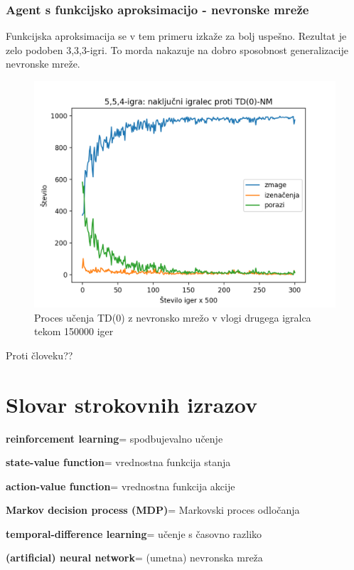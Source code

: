 \documentclass[12pt,a4paper]{amsart}
\theoremstyle{definition} %
\theoremstyle{plain} %
\newcommand{\geslo}[2]{\noindent\textbf{#1}\hspace*{3mm}\hangindent=\parindent\hangafter=1 #2}
\begin{document}
\subsubsection{Agent s funkcijsko aproksimacijo - nevronske mreže}
Funkcijska aproksimacija se v tem primeru izkaže za bolj uspešno. Rezultat je zelo podoben 
$3$,$3$,$3$-igri. To morda nakazuje na dobro sposobnost generalizacije nevronske mreže. 

\begin{figure}[H]
    \includegraphics[scale=0.8]{../rezultati/tdnn-554-150000-2.png}
    \caption{Proces učenja TD($0$) z nevronsko mrežo v vlogi drugega igralca tekom 150000 iger}
\end{figure}

Proti človeku??

\section*{Slovar strokovnih izrazov}

\geslo{reinforcement learning}{spodbujevalno učenje}

\geslo{state-value function}{vrednostna funkcija stanja}

\geslo{action-value function}{vrednostna funkcija akcije}

\geslo{Markov decision process (MDP)}{Markovski proces odločanja}

\geslo{temporal-difference learning}{učenje s časovno razliko}

\geslo{(artificial) neural network}{(umetna) nevronska mreža}
\end{document}
